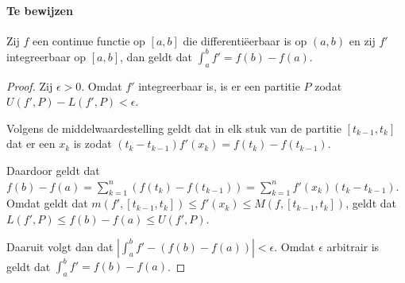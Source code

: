 \label{sec:AH}
\paragraph{Te bewijzen} Zij $f$ een continue functie op $[a,b]$ die differentiëerbaar is op $(a,b)$ en zij $f'$ integreerbaar op $[a,b]$, dan geldt dat $\int_{a}^{b}f'=f(b)-f(a)$.

\begin{proof}
  Zij $\epsilon>0$. Omdat $f'$ integreerbaar is, is er een partitie $P$ zodat $U(f',P)-L(f',P)<\epsilon$. \medskip

  \noindent Volgens de middelwaardestelling geldt dat in elk stuk van de partitie $[t_{k-1},t_{k}]$ dat er een $x_{k}$ is zodat $(t_{k}-t_{k-1})f'(x_{k})=f(t_{k})-f(t_{k-1})$. \medskip

  \noindent Daardoor geldt dat $f(b)-f(a)=\sum\limits_{k=1}^{n}(f(t_{k})-f(t_{k-1}))=\sum\limits_{k=1}^{n}f'(x_{k})(t_{k}-t_{k-1})$. Omdat geldt dat $m(f',[t_{k-1},t_{k}])\leq f'(x_{k})\leq M(f,[t_{k-1},t_{k}])$, geldt dat $L(f',P)\leq f(b)-f(a)\leq U(f',P)$. \medskip

  \noindent Daaruit volgt dan dat $|\int_{a}^{b}f'-(f(b)-f(a))|<\epsilon$. Omdat $\epsilon$ arbitrair is geldt dat $\int_{a}^{b}f'=f(b)-f(a)$.
\end{proof}

